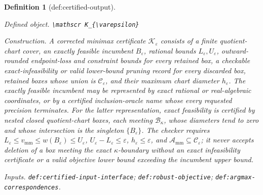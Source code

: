 \documentclass{article}
\newtheorem{definition}{Definition}
\begin{document}
\begin{definition}[def:certified-output]\label{def:certified-output}
\par\smallskip\noindent\emph{Defined object.} \texttt{\textbackslash{}\allowbreak{}mathscr K\_\allowbreak{}\{\textbackslash{}\allowbreak{}varepsilon\}\allowbreak{}}
\par\smallskip\noindent\emph{Construction.} A corrected minimax certificate \(\mathscr K_{\varepsilon}\) consists of a finite quotient-chart cover, an exactly feasible incumbent \(B_{\varepsilon}\), rational bounds \(L_{\varepsilon},U_{\varepsilon}\), outward-rounded endpoint-loss and constraint bounds for every retained box, a checkable exact-infeasibility or valid lower-bound pruning record for every discarded box, retained boxes whose union is \(\mathcal C_\varepsilon\), and their maximum chart diameter \(h_{\varepsilon}\).  The exactly feasible incumbent may be represented by exact rational or real-algebraic coordinates, or by a certified inclusion-oracle name whose every requested precision terminates.  For the latter representation, exact feasibility is certified by nested closed quotient-chart boxes, each meeting \(\mathcal B_\kappa\), whose diameters tend to zero and whose intersection is the singleton \(\{B_{\varepsilon}\}\).  The checker requires \(L_{\varepsilon}\le v_{\mathrm{mm}}\le w(B_{\varepsilon})\le U_{\varepsilon}\), \(U_{\varepsilon}-L_{\varepsilon}\le\varepsilon\), \(h_{\varepsilon}\le\varepsilon\), and \(\mathcal A_{\mathrm{mm}}\subseteq\mathcal C_\varepsilon\); it never accepts deletion of a box meeting the exact \(\kappa\)-boundary without an exact infeasibility certificate or a valid objective lower bound exceeding the incumbent upper bound.
\par\smallskip\noindent\emph{Inputs.} \texttt{def:\allowbreak{}certified-\allowbreak{}input-\allowbreak{}interface}; \texttt{def:\allowbreak{}robust-\allowbreak{}objective}; \texttt{def:\allowbreak{}argmax-\allowbreak{}correspondences}.
\end{definition}
\end{document}
